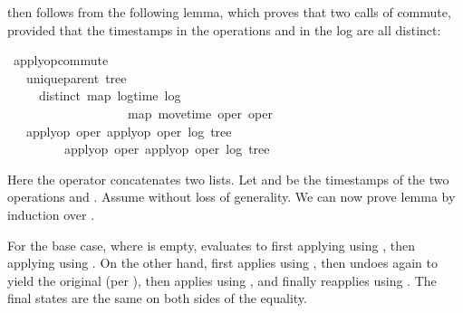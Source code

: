 \documentclass[sigplan,anonymous]{acmart}
\renewenvironment{isabelle}{%
  \medbreak\noindent%
  \renewcommand{\isanewline}{\\}%
  \begin{minipage}{\columnwidth}%
  \begin{isabellebody}%
  \begin{tabbing}%
}{%
  \end{tabbing}%
  \end{isabellebody}%
  \end{minipage}%
  \medbreak%
}
\renewcommand{\isacartoucheopen}{}
\renewcommand{\isacartoucheclose}{}
\begin{document}
\noindent {} then follows from the following lemma, which proves that two calls of  commute, provided that the timestamps in the operations and in the log are all distinct:
\begin{isabelle}
\isamarkupfalse%
\ apply{\isacharunderscore}op{\isacharunderscore}commute{}{\isacharcolon}\isanewline
\ \ \ {\isacartoucheopen}unique{\isacharunderscore}parent\ tree{\isacartoucheclose}\isanewline
\ \ \ \ \ {\isacartoucheopen}distinct\ {\isacharparenleft}{\isacharparenleft}map\ log{\isacharunderscore}time\ log{\isacharparenright}\ {\isacharat}\isanewline
\ \ \ \ \ \ \ \ \ \ \ \ \ \ \ \ \ \ \ {\isacharparenleft}map\ move{\isacharunderscore}time\ {\isacharbrackleft}oper{}{\isacharcomma}\ oper{}{\isacharbrackright}{\isacharparenright}{\isacharparenright}{\isacartoucheclose}\isanewline
\ \ \ {\isacartoucheopen}apply{\isacharunderscore}op\ oper{}\ {\isacharparenleft}apply{\isacharunderscore}op\ oper{}\ {\isacharparenleft}log{\isacharcomma}\ tree{\isacharparenright}{\isacharparenright}\ {\isacharequal}\isanewline
\ \ \ \ \ \ \ \ \ apply{\isacharunderscore}op\ oper{}\ {\isacharparenleft}apply{\isacharunderscore}op\ oper{}\ {\isacharparenleft}log{\isacharcomma}\ tree{\isacharparenright}{\isacharparenright}{\isacartoucheclose}
\end{isabelle}

\noindent Here the \isa{\isacharat} operator concatenates two lists.
Let  and  be the timestamps of the two operations  and .
Assume  without loss of generality.
We can now prove lemma  by induction over .

For the base case, where  is empty,  evaluates to first applying  using , then applying  using .
On the other hand,  first applies  using , then undoes  again to yield the original  (per ), then applies  using , and finally reapplies  using .
The final states are the same on both sides of the equality.
\end{document}
